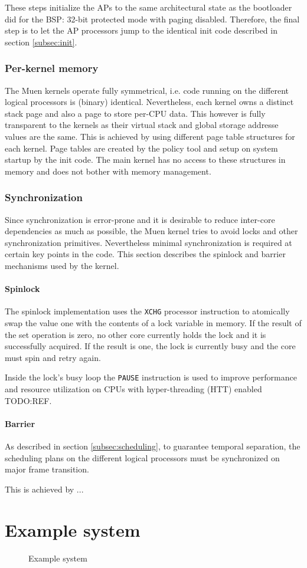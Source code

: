 These steps initialize the APs to the same architectural state as the
bootloader did for the BSP: 32-bit protected mode with paging disabled.
Therefore, the final step is to let the AP processors jump to the identical
init code described in section \ref{subsec:init}.

\subsubsection{Per-kernel memory}
The Muen kernels operate fully symmetrical, i.e. code running on the different
logical processors is (binary) identical. Nevertheless, each kernel owns a
distinct stack page and also a page to store per-CPU data. This however is fully
transparent to the kernels as their virtual stack and global storage addresse
values are the same. This is achieved by using different page table structures
for each kernel. Page tables are created by the policy tool and setup on system
startup by the init code. The main kernel has no access to these structures in
memory and does not bother with memory management.

\subsubsection{Synchronization} Since synchronization is error-prone and it is
desirable to reduce inter-core dependencies as much as possible, the Muen
kernel tries to avoid locks and other synchronization primitives. Nevertheless
minimal synchronization is required at certain key points in the code. This
section describes the spinlock and barrier mechanisms used by the kernel.

\paragraph{Spinlock}
The spinlock implementation uses the \texttt{XCHG} processor instruction to
atomically swap the value one with the contents of a lock variable in memory.
If the result of the set operation is zero, no other core currently holds the
lock and it is successfully acquired. If the result is one, the lock is
currently busy and the core must spin and retry again.

Inside the lock's busy loop the \texttt{PAUSE} instruction is used to improve
performance and resource utilization on CPUs with hyper-threading
(HTT) enabled TODO:REF.

\paragraph{Barrier}
As described in section \ref{subsec:scheduling}, to guarantee temporal
separation, the scheduling plans on the different logical processors must be
synchronized on major frame transition.

This is achieved by ...




\section{Example system}\label{sec:example-system}
\begin{figure}[h]
	\centering
	
	\caption{Example system}
	\label{fig:example-system}
\end{figure}

